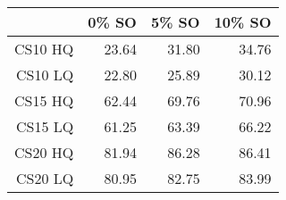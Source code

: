 \begin{table}[ht]
\begin{center}
\begin{tabular}{rrrr}
  \hline
 & 0\% SO & 5\% SO & 10\% SO \\
  \hline
CS10 HQ & 23.64 & 31.80 & 34.76 \\
  CS10 LQ & 22.80 & 25.89 & 30.12 \\
  CS15 HQ & 62.44 & 69.76 & 70.96 \\
  CS15 LQ & 61.25 & 63.39 & 66.22 \\
  CS20 HQ & 81.94 & 86.28 & 86.41 \\
  CS20 LQ & 80.95 & 82.75 & 83.99 \\
   \hline
\end{tabular}
\end{center}
\end{table}


